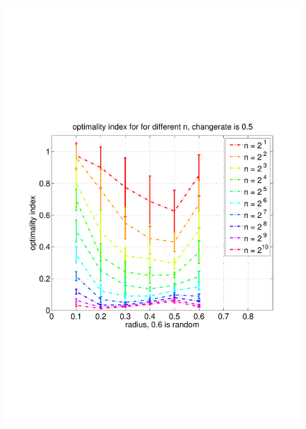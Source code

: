 \documentclass[11pt]{article}
\begin{document}
\begin{figure}
	\includegraphics[width=\linewidth]{../../code/data/2014_12_12_00_55_41/figure_5}
\end{figure}
\end{document}

